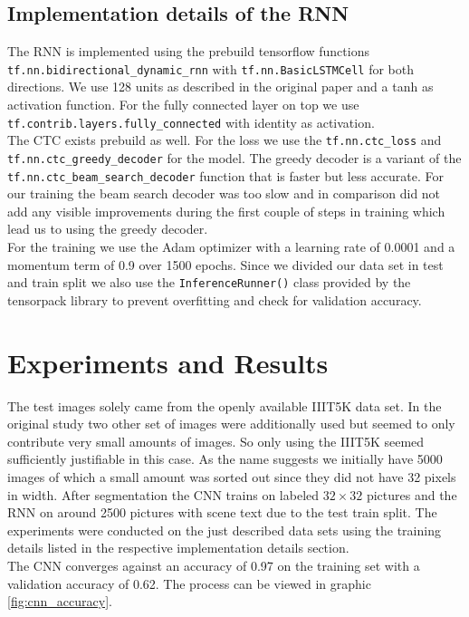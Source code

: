 \documentclass{utue} %
\begin{document}
\subsection{Implementation details of the RNN}
The RNN is implemented using the prebuild tensorflow functions \texttt{tf.nn.bidirectional\_dynamic\_rnn} with \texttt{tf.nn.BasicLSTMCell} for both directions. We use 128 units as described in the original paper and a tanh as activation function. For the fully connected layer on top we use \texttt{tf.contrib.layers.fully\_connected} with identity as activation. \\
The CTC exists prebuild as well. For the loss we use the \texttt{tf.nn.ctc\_loss} and \texttt{tf.nn.ctc\_greedy\_decoder} for the model. The greedy decoder is a variant of the \texttt{tf.nn.ctc\_beam\_search\_decoder} function that is faster but less accurate. For our training the beam search decoder was too slow and in comparison did not add any visible improvements during the first couple of steps in training which lead us to using the greedy decoder.  \\
For the training we use the Adam optimizer with a learning rate of 0.0001 and a momentum term of 0.9 over 1500 epochs. Since we divided our data set in test and train split we also use the \texttt{InferenceRunner()} class provided by the tensorpack library to prevent overfitting and check for validation accuracy. 

\section{Experiments and Results}
The test images solely came from the openly available IIIT5K data set. In the original study two other set of images were additionally used but seemed to only contribute very small amounts of images. So only using the IIIT5K seemed sufficiently justifiable in this case. As the name suggests we initially have 5000 images of which a small amount was sorted out since they did not have 32 pixels in width. After segmentation the CNN trains on %
labeled $32\times32$ pictures and the RNN on around 2500 pictures with scene text due to the test train split. 
The experiments were conducted on the just described data sets using the training details listed in the respective implementation details section. \\
The CNN converges against an accuracy of 0.97 on the training set with a validation accuracy of 0.62. The process can be viewed in graphic  \ref{fig:cnn_accuracy}.\\
\end{document}
